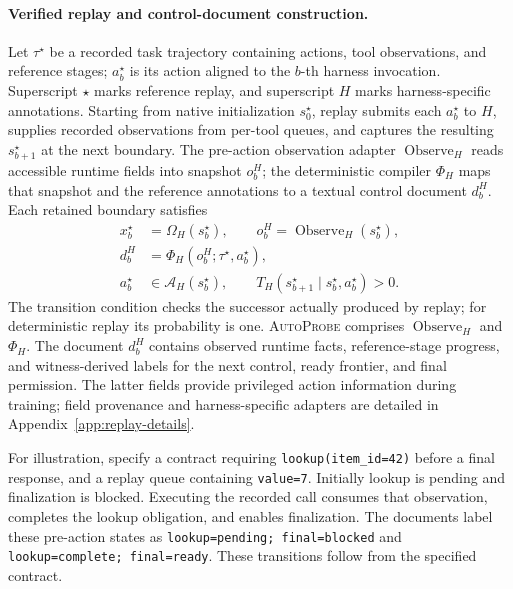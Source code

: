 \documentclass{article}
\newcommand{\autoprobe}{\textsc{AutoProbe}}
\begin{document}
\paragraph{Verified replay and control-document construction.}
Let $\tau^\star$ be a recorded task trajectory containing actions, tool
observations, and reference stages; $a_b^\star$ is its action aligned to the
$b$-th harness invocation. Superscript $\star$ marks reference replay, and
superscript $H$ marks harness-specific annotations. Starting from native
initialization $s_0^\star$, replay submits each $a_b^\star$ to $H$, supplies
recorded observations from per-tool queues, and captures the resulting
$s_{b+1}^\star$ at the next boundary. The pre-action observation adapter
$\operatorname{Observe}_H$ reads accessible runtime fields into snapshot
$o_b^H$; the deterministic compiler $\Phi_H$ maps that snapshot and the
reference annotations to a textual control document $d_b^H$.
Each retained boundary satisfies
\begin{equation}
\begin{aligned}
x_b^\star
&=\Omega_H(s_b^\star),\qquad
o_b^H=\operatorname{Observe}_H(s_b^\star),\\
d_b^H
&=\Phi_H(o_b^H;\tau^\star,a_b^\star),\\
a_b^\star
&\in\mathcal A_H(s_b^\star),\qquad
T_H(s_{b+1}^\star\mid s_b^\star,a_b^\star)>0.
\end{aligned}
\label{eq:verified-replay}
\end{equation}
The transition condition checks the successor actually produced by replay;
for deterministic replay its probability is one. \autoprobe{} comprises
$\operatorname{Observe}_H$ and $\Phi_H$. The document $d_b^H$ contains
observed runtime facts, reference-stage progress, and witness-derived labels
for the next control, ready frontier, and final permission. The latter fields
provide privileged action information during training; field provenance and
harness-specific adapters are detailed in Appendix~\ref{app:replay-details}.

For illustration, specify a contract requiring
\texttt{lookup(item\_id=42)} before a final response, and a replay queue
containing \texttt{value=7}. Initially lookup is pending and finalization is
blocked. Executing the recorded call consumes that observation, completes
the lookup obligation, and enables finalization. The documents label these
pre-action states as \texttt{lookup=pending; final=blocked} and
\texttt{lookup=complete; final=ready}. These transitions follow from the
specified contract.
\end{document}
